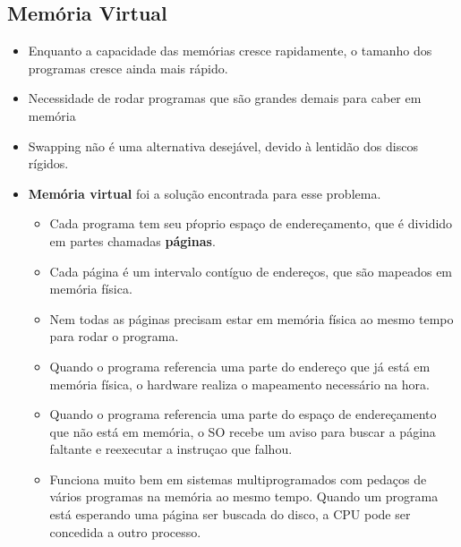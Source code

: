 \documentclass[10pt]{article}
\begin{document}
\subsection{Memória Virtual}
\begin{itemize}
    \item Enquanto a capacidade das memórias cresce rapidamente, o tamanho dos programas cresce 
        ainda mais rápido.
    \item Necessidade de rodar programas que são grandes demais para caber em memória
    \item Swapping não é uma alternativa desejável, devido à lentidão dos discos rígidos.
    \item \textbf{Memória virtual} foi a solução encontrada para esse problema.
        \begin{itemize}
            \item Cada programa tem seu pŕoprio espaço de endereçamento, que é dividido
                em partes chamadas \textbf{páginas}.
            \item Cada página é um intervalo contíguo de endereços, que são mapeados em
                memória física.
            \item Nem todas as páginas precisam estar em memória física ao mesmo tempo para 
                rodar o programa.
            \item Quando o programa referencia uma parte do endereço que já está
                em memória física, o hardware realiza o mapeamento necessário na hora.
            \item Quando o programa referencia uma parte do espaço de endereçamento 
                que não está em memória, o SO recebe um aviso para buscar a página
                faltante e reexecutar a instruçao que falhou.
            \item Funciona muito bem em sistemas multiprogramados com pedaços de vários
                programas na memória ao mesmo tempo. Quando um programa está esperando
                uma página ser buscada do disco, a CPU pode ser concedida a outro
                processo.
        \end{itemize}
\end{itemize}
\end{document}
